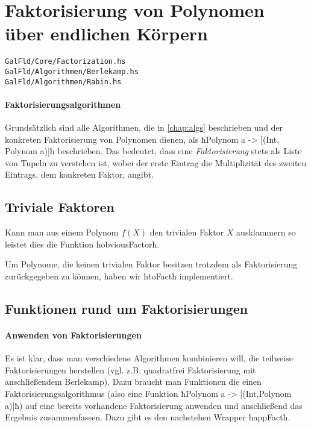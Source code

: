 \section{Faktorisierung von Polynomen über endlichen Körpern}
\texttt{GalFld/Core/Factorization.hs}\\
\texttt{GalFld/Algorithmen/Berlekamp.hs}\\
\texttt{GalFld/Algorithmen/Rabin.hs}


\paragraph{Faktorisierungsalgorithmen} Grundsätzlich sind alle Algorithmen, die
in \autoref{chap:algs} beschrieben und der konkreten Faktorisierung von
Polynomen dienen, als ħPolynom a -> [(Int, Polynom a)]ħ beschrieben. Das
bedeutet, dass eine \emph{Faktorisierung} stets als Liste von Tupeln zu
verstehen ist, wobei der erste Eintrag die Multiplizität des zweiten Eintrags,
dem konkreten Faktor, angibt.


\subsection{Triviale Faktoren} Kann man aus einem Polynom $f(X)$ 
den trivialen Faktor $X$ ausklammern so leistet dies die Funktion
ħobviousFactorħ.


Um Polynome, die keinen trivialen Faktor besitzen trotzdem als Faktorisierung
zurückgegeben zu können, haben wir ħtoFactħ implementiert.



\subsection{Funktionen rund um Faktorisierungen}

\paragraph{Anwenden von Faktorisierungen} 
Es ist klar, dass man verschiedene Algorithmen kombinieren will, die teilweise
Faktorisierungen herstellen (vgl. z.B. quadratfrei Faktorisierung mit
anschließendem Berlekamp). Dazu braucht man Funktionen die einen
Faktorisierungsalgorithmus (also eine Funktion 
ħPolynom a -> [(Int,Polynom a)]ħ) auf eine bereits vorhandene 
Faktorisierung anwenden und anschließend das
Ergebnis zusammenfassen. Dazu gibt es den nachstehen Wrapper ħappFactħ.

